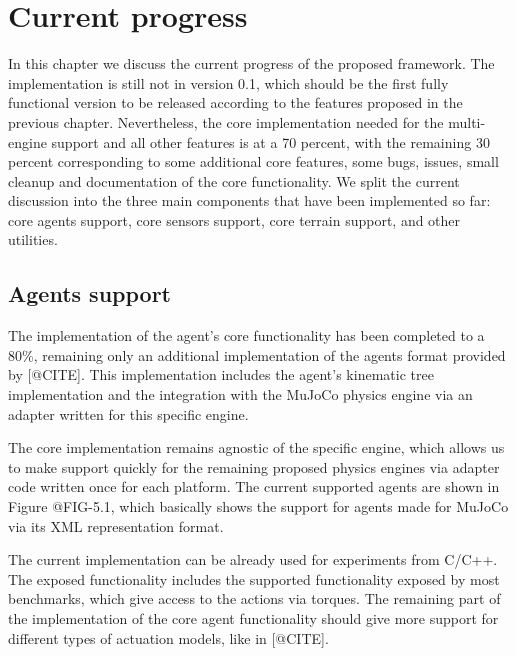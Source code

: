 
\chapter{Current progress}
\label{ch:current_progress}



In this chapter we discuss the current progress of the proposed framework. The implementation
is still not in version 0.1, which should be the first fully functional version to be released
according to the features proposed in the previous chapter. Nevertheless, the core implementation
needed for the multi-engine support and all other features is at a 70 percent, 
with the remaining
30 percent corresponding to some additional core features, some bugs, issues, small cleanup and 
documentation of the core functionality. We split the current discussion into the three main 
components that have been implemented so far: core agents support, core sensors support, core 
terrain support, and other utilities.

\section{Agents support}

The implementation of the agent's core functionality has been completed to a 80\%,
remaining only an additional implementation of the agents format provided by [@CITE].
This implementation includes the agent's kinematic tree implementation and the integration 
with the MuJoCo physics engine via an adapter written for this specific engine.

The core implementation remains agnostic of the specific engine, which allows us
to make support quickly for the remaining proposed physics engines via adapter code
written once for each platform. The current supported agents are shown in Figure @FIG-5.1,
which basically shows the support for agents made for MuJoCo via its XML representation format.

The current implementation can be already used for experiments from C/C++. The exposed
functionality includes the supported functionality exposed by most benchmarks, which
give access to the actions via torques. The remaining part of the implementation of the core
agent functionality should give more support for different types of actuation models, like in [@CITE].

